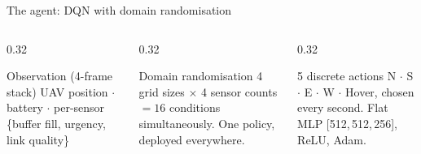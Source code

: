 \documentclass[aspectratio=169,11pt]{beamer}
\begin{document}
\begin{frame}[t]{The agent: DQN with domain randomisation}
  \vspace{0.4em}
  \centering
  \resizebox{0.96\linewidth}{!}{}\\[0.4em]
  \begin{columns}[T]
    \begin{column}{0.32\textwidth}
      \begin{block}{Observation (4-frame stack)}
        \footnotesize
        UAV position $\cdot$ battery $\cdot$ per-sensor
        \{buffer fill, urgency, link quality\}
      \end{block}
    \end{column}
    \begin{column}{0.32\textwidth}
      \begin{block}{Domain randomisation}
        \footnotesize
        4 grid sizes $\times$ 4 sensor counts
        $= 16$ conditions simultaneously.
        One policy, deployed everywhere.
      \end{block}
    \end{column}
    \begin{column}{0.32\textwidth}
      \begin{block}{5 discrete actions}
        \footnotesize
        N $\cdot$ S $\cdot$ E $\cdot$ W $\cdot$ Hover,
        chosen every second.
        Flat MLP [512,\,512,\,256], ReLU, Adam.
      \end{block}
    \end{column}
  \end{columns}
\end{frame}


\end{document}

